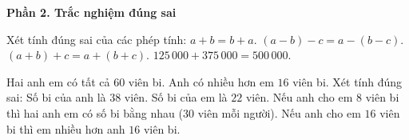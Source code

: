\textbf{Phần 2. Trắc nghiệm đúng sai}

\begin{ex} %
Xét tính đúng sai của các phép tính:
\choiceTF
{\True $a + b = b + a$.}
{$(a - b) - c = a - (b - c)$.}
{\True $(a + b) + c = a + (b + c)$.}
{\True $125\,000 + 375\,000 = 500\,000$.}
\end{ex}

\begin{ex} %
Hai anh em có tất cả $60$ viên bi. Anh có nhiều hơn em $16$ viên bi. Xét tính đúng sai:
\choiceTF
{\True Số bi của anh là $38$ viên.}
{\True Số bi của em là $22$ viên.}
{Nếu anh cho em $8$ viên bi thì hai anh em có số bi bằng nhau ($30$ viên mỗi người).}
{\True Nếu anh cho em $16$ viên bi thì em nhiều hơn anh $16$ viên bi.}
\end{ex}

